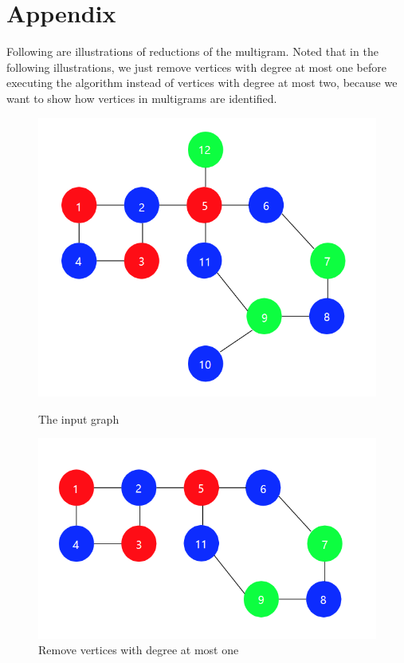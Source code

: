 \section{Appendix}
Following are illustrations of reductions of the multigram. Noted that in the following illustrations, we just remove vertices with degree at most one before executing the algorithm instead of vertices with degree at most two, because we want to show how vertices in multigrams are identified.   

\begin{figure}[htbp]
\centering
\begin{minipage}[t]{0.5\textwidth}
\centering
\includegraphics[width=1\textwidth]{figure/1.png}
\caption{\small The input graph}
\end{minipage}
\begin{minipage}[t]{0.48\textwidth}
\centering
\includegraphics[width=1\textwidth]{figure/2.png}
\caption{\small Remove vertices with degree at most one}
\end{minipage}
\end{figure}

